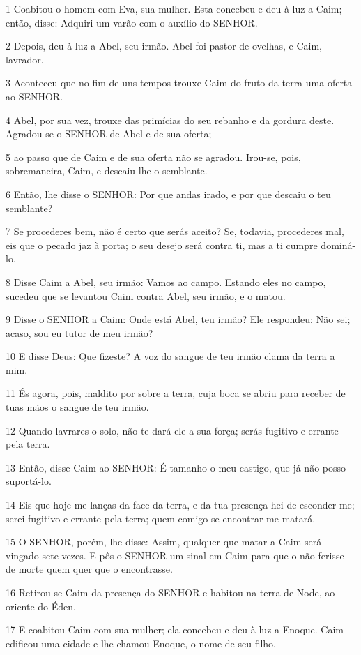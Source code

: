 \par 1 Coabitou o homem com Eva, sua mulher. Esta concebeu e deu à luz a Caim; então, disse: Adquiri um varão com o auxílio do SENHOR.
\par 2 Depois, deu à luz a Abel, seu irmão. Abel foi pastor de ovelhas, e Caim, lavrador.
\par 3 Aconteceu que no fim de uns tempos trouxe Caim do fruto da terra uma oferta ao SENHOR.
\par 4 Abel, por sua vez, trouxe das primícias do seu rebanho e da gordura deste. Agradou-se o SENHOR de Abel e de sua oferta;
\par 5 ao passo que de Caim e de sua oferta não se agradou. Irou-se, pois, sobremaneira, Caim, e descaiu-lhe o semblante.
\par 6 Então, lhe disse o SENHOR: Por que andas irado, e por que descaiu o teu semblante?
\par 7 Se procederes bem, não é certo que serás aceito? Se, todavia, procederes mal, eis que o pecado jaz à porta; o seu desejo será contra ti, mas a ti cumpre dominá-lo.
\par 8 Disse Caim a Abel, seu irmão: Vamos ao campo. Estando eles no campo, sucedeu que se levantou Caim contra Abel, seu irmão, e o matou.
\par 9 Disse o SENHOR a Caim: Onde está Abel, teu irmão? Ele respondeu: Não sei; acaso, sou eu tutor de meu irmão?
\par 10 E disse Deus: Que fizeste? A voz do sangue de teu irmão clama da terra a mim.
\par 11 És agora, pois, maldito por sobre a terra, cuja boca se abriu para receber de tuas mãos o sangue de teu irmão.
\par 12 Quando lavrares o solo, não te dará ele a sua força; serás fugitivo e errante pela terra.
\par 13 Então, disse Caim ao SENHOR: É tamanho o meu castigo, que já não posso suportá-lo.
\par 14 Eis que hoje me lanças da face da terra, e da tua presença hei de esconder-me; serei fugitivo e errante pela terra; quem comigo se encontrar me matará.
\par 15 O SENHOR, porém, lhe disse: Assim, qualquer que matar a Caim será vingado sete vezes. E pôs o SENHOR um sinal em Caim para que o não ferisse de morte quem quer que o encontrasse.
\par 16 Retirou-se Caim da presença do SENHOR e habitou na terra de Node, ao oriente do Éden.
\par 17 E coabitou Caim com sua mulher; ela concebeu e deu à luz a Enoque. Caim edificou uma cidade e lhe chamou Enoque, o nome de seu filho.
